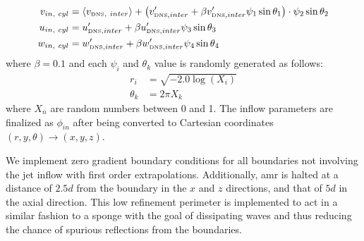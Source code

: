 \begin{subequations} \label{Jet_Inflow_noise}
	\begin{align}
		v_{in,\ cyl} &= \langle v_{\text{\tiny{DNS}},\ inter} \rangle + \big(  v^{\prime}_{\text{\tiny{DNS}}, inter}  + \beta  v^{\prime}_{\text{\tiny{DNS}}, inter}    	\psi_1\sin{\theta_1}  \big) \cdot \psi_2 \sin{\theta_2} \label{y_flow} \\
		u_{in,\ cyl} &=   u^{\prime}_{\text{\tiny{DNS}}, inter}  + \beta  u^{\prime}_{\text{\tiny{DNS}}, inter}  \psi_3\sin{\theta_3} \label{t_flow} \\
		w_{in,\ cyl} &=   w^{\prime}_{\text{\tiny{DNS}}, inter}  + \beta  w^{\prime}_{\text{\tiny{DNS}}, inter}  \psi_4\sin{\theta_4}  \label{theta_flow}
	\end{align}
\end{subequations}  
where $\beta = 0.1$ and each $\psi_i$ and $\theta_k$ value is randomly generated as follows:
\begin{subequations} \label{Random_Variables}
	\begin{align}
		r_i &= \sqrt{-2.0 \log{(X_i)}} \label{Random_r} \\
		\theta_k &= 2 \pi X_k \label{Radom_theta}
	\end{align}
\end{subequations}
where $X_n$ are random numbers between 0 and 1. The inflow parameters are finalized as $\phi_{in}$ after being converted to Cartesian coordinates $(r,y,\theta) \to (x,y,z)$. 

We implement zero gradient boundary conditions for all boundaries not involving the jet inflow with first order extrapolations. Additionally, \gls{amr} is halted at a distance of $2.5d$ from the boundary in the $x$ and $z$ directions, and that of $5d$ in the axial direction. This low refinement perimeter is implemented to act in a similar fashion to a sponge with the goal of dissipating waves and thus reducing the chance of spurious reflections from the boundaries.


